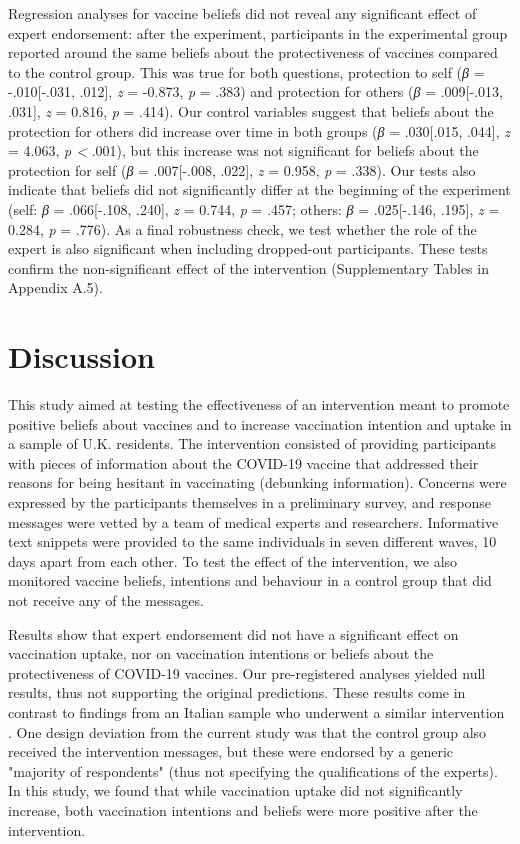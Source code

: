 \documentclass[authordate, empirical]{jote-new-article}
\begin{document}
Regression analyses for vaccine beliefs did not reveal any significant effect of expert endorsement: after the experiment, participants in the experimental group reported around the same beliefs about the protectiveness of vaccines compared to the control group. This was true for both questions, protection to self (\emph{β }= -.010[-.031, .012], \emph{z }= -0.873, \emph{p }= .383) and protection for others (\emph{β }= .009[-.013, .031], \emph{z }= 0.816, \emph{p }= .414). Our control variables suggest that beliefs about the protection for others did increase over time in both groups (\emph{β }= .030[.015, .044], \emph{z }= 4.063, \emph{p < }.001), but this increase was not significant for beliefs about the protection for self (\emph{β }= .007[-.008, .022], \emph{z }= 0.958, \emph{p }= .338). Our tests also indicate that beliefs did not significantly differ at the beginning of the experiment (self: \emph{β }= .066[-.108, .240], \emph{z }= 0.744, \emph{p }= .457; others: \emph{β }= .025[-.146, .195], \emph{z }= 0.284, \emph{p }= .776). As a final robustness check, we test whether the role of the expert is also significant when including dropped-out participants. These tests confirm the non-significant effect of the intervention (Supplementary Tables in Appendix A.5).



\section{Discussion}



This study aimed at testing the effectiveness of an intervention meant to promote positive beliefs about vaccines and to increase vaccination intention and uptake in a sample of U.K. residents. The intervention consisted of providing participants with pieces of information about the COVID-19 vaccine that addressed their reasons for being hesitant in vaccinating (debunking information). Concerns were expressed by the participants themselves in a preliminary survey, and response messages were vetted by a team of medical experts and researchers. Informative text snippets were provided to the same individuals in seven different waves, 10 days apart from each other. To test the effect of the intervention, we also monitored vaccine beliefs, intentions and behaviour in a control group that did not receive any of the messages.



Results show that expert endorsement did not have a significant effect on vaccination uptake, nor on vaccination intentions or beliefs about the protectiveness of COVID-19 vaccines. Our pre-registered analyses yielded null results, thus not supporting the original predictions. These results come in contrast to findings from an Italian sample who underwent a similar intervention \parencites{Ronzani2022}. One design deviation from the current study was that the control group also received the intervention messages, but these were endorsed by a generic "majority of respondents" (thus not specifying the qualifications of the experts). In this study, we found that while vaccination uptake did not significantly increase, both vaccination intentions and beliefs were more positive after the intervention.
\end{document}
